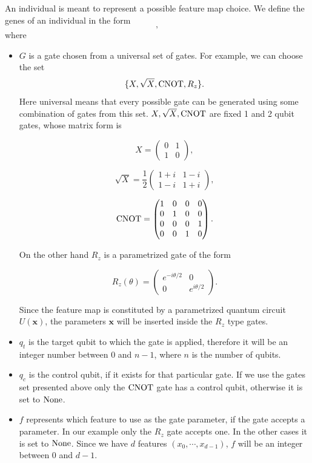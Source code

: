 \documentclass[12pt]{article}
\begin{document}
An individual is meant to represent a possible feature map choice. We define the genes of an individual in the form 
\begin{equation}
    [G, q_t, q_c, f],
\end{equation} 
where
\begin{itemize}
    \item $G$ is a gate chosen from a universal set of gates. For example, we can choose the set \begin{equation}
        \{X, \sqrt{X}, \textup{CNOT}, R_z\}.
    \end{equation}
    Here universal means that every possible gate can be generated using some combination of gates from this set. 
    $X, \sqrt{X}, \textup{CNOT}$ are fixed 1 and 2 qubit gates, whose matrix form is

\[
X = \begin{pmatrix}
0 & 1 \\
1 & 0
\end{pmatrix},
\]

\[
\sqrt{X} = \frac{1}{2} \begin{pmatrix}
1 + i & 1 - i \\
1 - i & 1 + i
\end{pmatrix},
\]

\[
\textup{CNOT} = \begin{pmatrix}
1 & 0 & 0 & 0 \\
0 & 1 & 0 & 0 \\
0 & 0 & 0 & 1 \\
0 & 0 & 1 & 0
\end{pmatrix}.
\]


On the other hand $R_z$ is a parametrized gate of the form

\[
R_z(\theta) = \begin{pmatrix}
e^{-i\theta/2} & 0 \\
0 & e^{i\theta/2}
\end{pmatrix}.
\]

Since the feature map is constituted by a parametrized quantum circuit $U(\mathbf{x})$, the parameters $\mathbf{x}$ will be inserted inside the $R_z$ type gates. 

\item $q_t$ is the target qubit to which the gate is applied, therefore it will be an integer number between $0$ and $n-1$, where $n$ is the number of qubits. 

\item $q_c$ is the control qubit, if it exists for that particular gate. If we use the gates set presented above only the $\textup{CNOT}$ gate has a control qubit, otherwise it is set to $\textup{None}$.

\item $f$ represents which feature to use as the gate parameter, if the gate accepts a parameter. In our example only the $R_z$ gate accepts one. In the other cases it is set to $\textup{None}$. Since we have $d$ features $(x_0, \cdots, x_{d-1})$, $f$ will be an integer between $0$ and $d-1$. 
\end{itemize}
\end{document}
